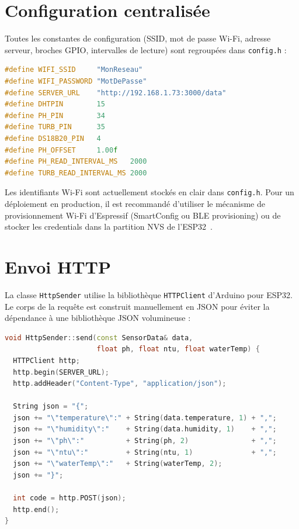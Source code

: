\documentclass[12pt,a4paper]{report}
\newcommand{\code}[1]{\texttt{\small\colorbox{codebg}{#1}}}
\begin{document}
\section{Configuration centralisée}

Toutes les constantes de configuration (SSID, mot de passe Wi-Fi, adresse serveur,
broches GPIO, intervalles de lecture) sont regroupées dans \code{config.h} :

\begin{lstlisting}[language=C++,caption={Extrait de config.h}]
#define WIFI_SSID     "MonReseau"
#define WIFI_PASSWORD "MotDePasse"
#define SERVER_URL    "http://192.168.1.73:3000/data"
#define DHTPIN        15
#define PH_PIN        34
#define TURB_PIN      35
#define DS18B20_PIN   4
#define PH_OFFSET     1.00f
#define PH_READ_INTERVAL_MS   2000
#define TURB_READ_INTERVAL_MS 2000
\end{lstlisting}

\begin{warningbox}
Les identifiants Wi-Fi sont actuellement stockés en clair dans \code{config.h}.
Pour un déploiement en production, il est recommandé d'utiliser le mécanisme
de provisionnement Wi-Fi d'Espressif (SmartConfig ou BLE provisioning) ou de
stocker les credentials dans la partition NVS de l'ESP32~\cite{espressif_esp32}.
\end{warningbox}

\section{Envoi HTTP}

La classe \code{HttpSender} utilise la bibliothèque \code{HTTPClient} d'Arduino pour
ESP32. Le corps de la requête est construit manuellement en JSON pour éviter la
dépendance à une bibliothèque JSON volumineuse :

\begin{lstlisting}[language=C++,caption={Construction et envoi du JSON -- http\_sender.cpp}]
void HttpSender::send(const SensorData& data,
                      float ph, float ntu, float waterTemp) {
  HTTPClient http;
  http.begin(SERVER_URL);
  http.addHeader("Content-Type", "application/json");

  String json = "{";
  json += "\"temperature\":" + String(data.temperature, 1) + ",";
  json += "\"humidity\":"    + String(data.humidity, 1)    + ",";
  json += "\"ph\":"          + String(ph, 2)               + ",";
  json += "\"ntu\":"         + String(ntu, 1)              + ",";
  json += "\"waterTemp\":"   + String(waterTemp, 2);
  json += "}";

  int code = http.POST(json);
  http.end();
}
\end{lstlisting}
\end{document}
